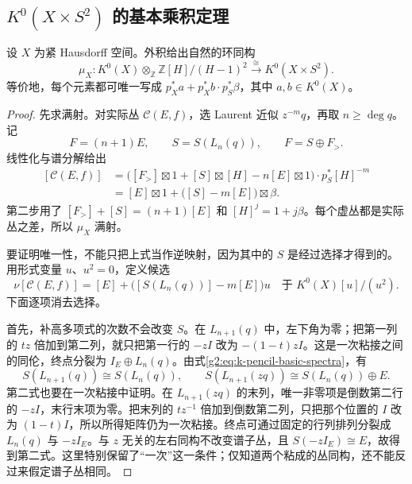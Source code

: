\subsection{\texorpdfstring{\(K^0(X\times S^2)\) 的基本乘积定理}{K⁰(X×S²) 的基本乘积定理}}
\label{g2:subsec:2403:06}
\begin{theorem}\label{g2:thm:k-basic-product}
	设 \(X\) 为紧 Hausdorff 空间。外积给出自然的环同构
	\[
		\mu_X:K^0(X)\otimes_{\mathbb Z}\mathbb Z[H]/(H-1)^2
		\xrightarrow{\ \cong\ }K^0(X\times S^2).
	\]
	等价地，每个元素都可唯一写成 \(p_X^*a+p_X^*b\cdot p_S^*\beta\)，其中 \(a,b\in K^0(X)\)。
\end{theorem}
\begin{proof}
	先求满射。对实际丛 \(\mathcal C(E,f)\)，选 Laurent 近似 \(z^{-m}q\)，再取 \(n\ge\deg q\)。记
	\[
		F=(n+1)E,\qquad S=S(L_n(q)),\qquad F=S\oplus F_>.
	\]
	线性化与谱分解给出
	\[
	\begin{aligned}
		[\mathcal C(E,f)]
		&=\bigl([F_>]\boxtimes1+[S]\boxtimes[H]-n[E]\boxtimes1\bigr)\cdot p_S^*[H]^{-m}\\
		&=[E]\boxtimes1+\bigl([S]-m[E]\bigr)\boxtimes\beta.
	\end{aligned}
	\]
	第二步用了 \([F_>]+[S]=(n+1)[E]\) 和 \([H]^j=1+j\beta\)。每个虚丛都是实际丛之差，所以 \(\mu_X\) 满射。

	要证明唯一性，不能只把上式当作逆映射，因为其中的 \(S\) 是经过选择才得到的。用形式变量 \(u\)、\(u^2=0\)，定义候选
	\begin{equation}\label{g2:eq:k-product-inverse}
		\nu[\mathcal C(E,f)]
		=[E]+\bigl([S(L_n(q))]-m[E]\bigr)u
		\quad\text{于 }K^0(X)[u]/(u^2).
	\end{equation}
	下面逐项消去选择。

	首先，补高多项式的次数不会改变 \(S\)。在 \(L_{n+1}(q)\) 中，左下角为零；把第一列的 \(tz\) 倍加到第二列，就只把第一行的 \(-zI\) 改为 \(-(1-t)zI\)。这是一次粘接之间的同伦，终点分裂为 \(I_E\oplus L_n(q)\)。由式\eqref{g2:eq:k-pencil-basic-spectra}，有
	\begin{equation}\label{g2:eq:k-linearization-stabilizations}
		S(L_{n+1}(q))\cong S(L_n(q)),\qquad
		S(L_{n+1}(zq))\cong S(L_n(q))\oplus E.
	\end{equation}
	第二式也要在一次粘接中证明。在 \(L_{n+1}(zq)\) 的末列，唯一非零项是倒数第二行的 \(-zI\)，末行末项为零。把末列的 \(tz^{-1}\) 倍加到倒数第二列，只把那个位置的 \(I\) 改为 \((1-t)I\)，所以所得矩阵仍为一次粘接。终点可通过固定的行列排列分裂成 \(L_n(q)\) 与 \(-zI_E\)。与 \(z\) 无关的左右同构不改变谱子丛，且 \(S(-zI_E)\cong E\)，故得到第二式。这里特别保留了“一次”这一条件；仅知道两个粘成的丛同构，还不能反过来假定谱子丛相同。


\end{proof}
